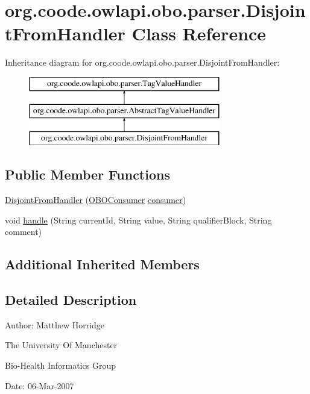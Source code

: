 \hypertarget{classorg_1_1coode_1_1owlapi_1_1obo_1_1parser_1_1_disjoint_from_handler}{\section{org.\-coode.\-owlapi.\-obo.\-parser.\-Disjoint\-From\-Handler Class Reference}
\label{classorg_1_1coode_1_1owlapi_1_1obo_1_1parser_1_1_disjoint_from_handler}
}
Inheritance diagram for org.\-coode.\-owlapi.\-obo.\-parser.\-Disjoint\-From\-Handler\-:\begin{figure}[H]
\begin{center}
\leavevmode
\includegraphics[height=3.000000cm]{classorg_1_1coode_1_1owlapi_1_1obo_1_1parser_1_1_disjoint_from_handler}
\end{center}
\end{figure}
\subsection*{Public Member Functions}
\begin{DoxyCompactItemize}
\item 
\hyperlink{classorg_1_1coode_1_1owlapi_1_1obo_1_1parser_1_1_disjoint_from_handler_a2389106d4be938bd881147dbfdc43acd}{Disjoint\-From\-Handler} (\hyperlink{classorg_1_1coode_1_1owlapi_1_1obo_1_1parser_1_1_o_b_o_consumer}{O\-B\-O\-Consumer} \hyperlink{classorg_1_1coode_1_1owlapi_1_1obo_1_1parser_1_1_abstract_tag_value_handler_ab27f1ff22d15640c5f81585f18265137}{consumer})
\item 
void \hyperlink{classorg_1_1coode_1_1owlapi_1_1obo_1_1parser_1_1_disjoint_from_handler_a8192541420ccc29eec936dd827593f62}{handle} (String current\-Id, String value, String qualifier\-Block, String comment)
\end{DoxyCompactItemize}
\subsection*{Additional Inherited Members}


\subsection{Detailed Description}
Author\-: Matthew Horridge\par
 The University Of Manchester\par
 Bio-\/\-Health Informatics Group\par
 Date\-: 06-\/\-Mar-\/2007\par
\par
 

